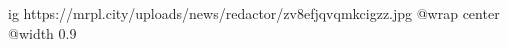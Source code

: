  
 
 
 
 

\ifcmt
  ig https://mrpl.city/uploads/news/redactor/zv8efjqvqmkcigzz.jpg
  @wrap center
  @width 0.9
\fi
